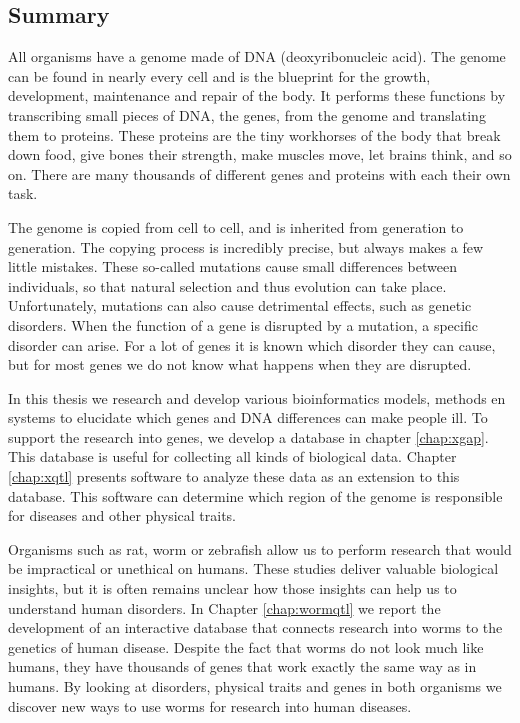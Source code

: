\begin{appendices}
	
	\chapter{Summary}
	All organisms have a genome made of DNA (deoxyribonucleic acid).
	The genome can be found in nearly every cell and is the blueprint for the growth, development, maintenance and repair of the body.
	It performs these functions by transcribing small pieces of DNA, the genes, from the genome and translating them to proteins.
	These proteins are the tiny workhorses of the body that break down food, give bones their strength, make muscles move, let brains think, and so on.
	There are many thousands of different genes and proteins with each their own task.
	
	The genome is copied from cell to cell, and is inherited from generation to generation.
	The copying process is incredibly precise, but always makes a few little mistakes.
	These so-called mutations cause small differences between individuals, so that natural selection and thus evolution can take place.
	Unfortunately, mutations can also cause detrimental effects, such as genetic disorders.
	When the function of a gene is disrupted by a mutation, a specific disorder can arise.
	For a lot of genes it is known which disorder they can cause, but for most genes we do not know what happens when they are disrupted.
	
	In this thesis we research and develop various bioinformatics models, methods en systems to elucidate which genes and DNA differences can make people ill.
	To support the research into genes, we develop a database in chapter \ref{chap:xgap}.
	This database is useful for collecting all kinds of biological data.
	Chapter \ref{chap:xqtl} presents software to analyze these data as an extension to this database.
	This software can determine which region of the genome is responsible for diseases and other physical traits.
	
	Organisms such as rat, worm or zebrafish allow us to perform research that would be impractical or unethical on humans.
	These studies deliver valuable biological insights, but it is often remains unclear how those insights can help us to understand human disorders.
	In Chapter \ref{chap:wormqtl} we report the development of an interactive database that connects research into worms to the genetics of human disease.
	Despite the fact that worms do not look much like humans, they have thousands of genes that work exactly the same way as in humans.
	By looking at disorders, physical traits and genes in both organisms we discover new ways to use worms for research into human diseases.
	

\end{appendices}
